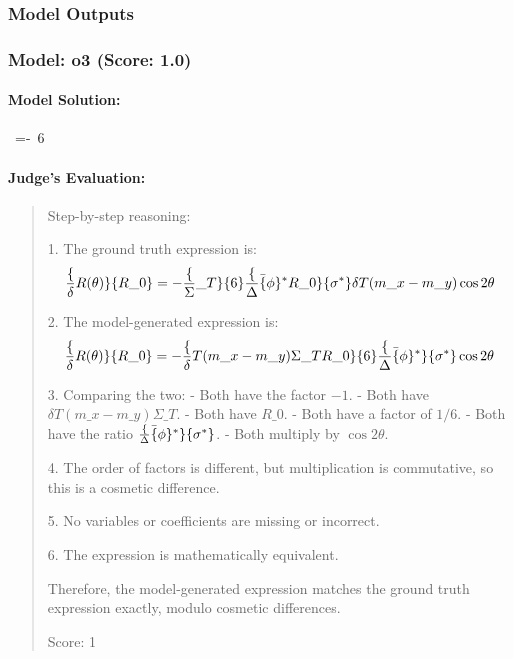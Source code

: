 \documentclass[10pt]{article}
\begin{document}
\subsubsection*{Model Outputs}
\subsubsection*{Model: o3 (Score: 1.0)}
\paragraph*{Model Solution:}
\,\displaystyle 
{}
          =-\,
                 {6}\,\frac{\Delta\bar{\phi}^{*}}{\sigma^{*}}
          \,\theta\,

\paragraph*{Judge's Evaluation:}
\begin{quote}\ttfamily Step-by-step reasoning:

1. The ground truth expression is:
\[
\frac\{\delta R(\theta)\}\{R\_0\} = -\frac\{\Sigma\_T\}\{6\} \frac\{\Delta\bar\{\phi\}^* R\_0\}\{\sigma^*\} \delta T (m\_x - m\_y) \cos 2\theta
\]

2. The model-generated expression is:
\[
\frac\{\delta R(\theta)\}\{R\_0\} = - \frac\{\delta T (m\_x - m\_y) \Sigma\_T R\_0\}\{6\} \frac\{\Delta\bar\{\phi\}^*\}\{\sigma^*\} \cos 2\theta
\]

3. Comparing the two:
   - Both have the factor \(-1\).
   - Both have \(\delta T (m\_x - m\_y) \Sigma\_T\).
   - Both have \(R\_0\).
   - Both have a factor of \(1/6\).
   - Both have the ratio \(\frac\{\Delta\bar\{\phi\}^*\}\{\sigma^*\}\).
   - Both multiply by \(\cos 2\theta\).

4. The order of factors is different, but multiplication is commutative, so this is a cosmetic difference.

5. No variables or coefficients are missing or incorrect.

6. The expression is mathematically equivalent.

Therefore, the model-generated expression matches the ground truth expression exactly, modulo cosmetic differences.

Score: 1\end{quote}

\newpage
\end{document}
